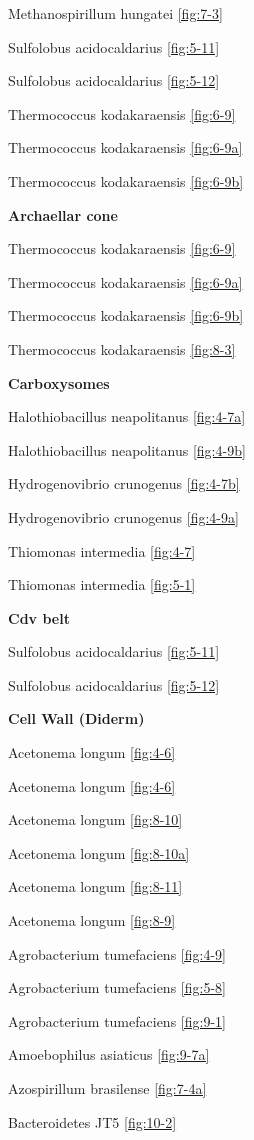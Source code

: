 \documentclass[]{tufte-book}
\begin{document}
Methanospirillum hungatei \ref{fig:7-3}

Sulfolobus acidocaldarius \ref{fig:5-11}

Sulfolobus acidocaldarius \ref{fig:5-12}

Thermococcus kodakaraensis \ref{fig:6-9}

Thermococcus kodakaraensis \ref{fig:6-9a}

Thermococcus kodakaraensis \ref{fig:6-9b}

\textbf{Archaellar cone}

Thermococcus kodakaraensis \ref{fig:6-9}

Thermococcus kodakaraensis \ref{fig:6-9a}

Thermococcus kodakaraensis \ref{fig:6-9b}

Thermococcus kodakaraensis \ref{fig:8-3}

\textbf{Carboxysomes}

Halothiobacillus neapolitanus \ref{fig:4-7a}

Halothiobacillus neapolitanus \ref{fig:4-9b}

Hydrogenovibrio crunogenus \ref{fig:4-7b}

Hydrogenovibrio crunogenus \ref{fig:4-9a}

Thiomonas intermedia \ref{fig:4-7}

Thiomonas intermedia \ref{fig:5-1}

\textbf{Cdv belt}

Sulfolobus acidocaldarius \ref{fig:5-11}

Sulfolobus acidocaldarius \ref{fig:5-12}

\textbf{Cell Wall (Diderm)}

Acetonema longum \ref{fig:4-6}

Acetonema longum \ref{fig:4-6}

Acetonema longum \ref{fig:8-10}

Acetonema longum \ref{fig:8-10a}

Acetonema longum \ref{fig:8-11}

Acetonema longum \ref{fig:8-9}

Agrobacterium tumefaciens \ref{fig:4-9}

Agrobacterium tumefaciens \ref{fig:5-8}

Agrobacterium tumefaciens \ref{fig:9-1}

Amoebophilus asiaticus \ref{fig:9-7a}

Azospirillum brasilense \ref{fig:7-4a}

Bacteroidetes JT5 \ref{fig:10-2}
\end{document}
